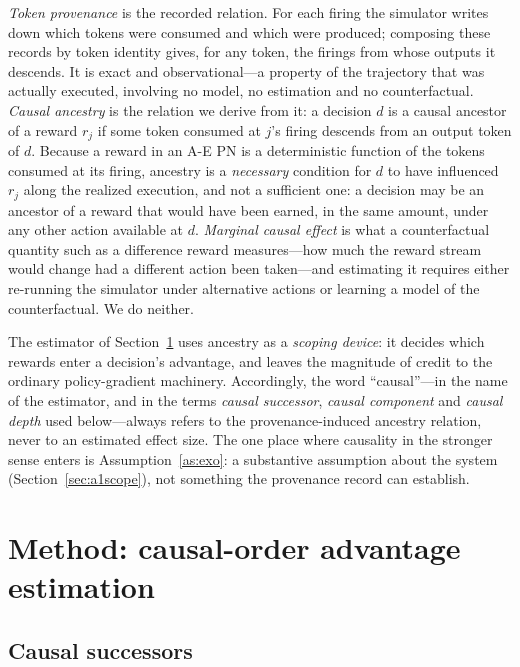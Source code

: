 \documentclass[review,authoryear,3p,times]{elsarticle}
\begin{document}
\emph{Token provenance} is the recorded relation. For each firing the simulator
writes down which tokens were consumed and which were produced; composing these
records by token identity gives, for any token, the firings from whose outputs
it descends. It is exact and observational---a property of the trajectory that
was actually executed, involving no model, no estimation and no counterfactual.
\emph{Causal ancestry} is the relation we derive from it: a decision $d$ is a
causal ancestor of a reward $r_j$ if some token consumed at $j$'s firing
descends from an output token of $d$. Because a reward in an A-E PN is a
deterministic function of the tokens consumed at its firing, ancestry is a
\emph{necessary} condition for $d$ to have influenced $r_j$ along the realized
execution, and not a sufficient one: a decision may be an ancestor of a reward
that would have been earned, in the same amount, under any other action
available at $d$. \emph{Marginal causal effect} is what a counterfactual
quantity such as a difference reward measures---how much the reward stream would
change had a different action been taken---and estimating it requires either
re-running the simulator under alternative actions or learning a model of the
counterfactual. We do neither.

The estimator of Section~\ref{sec:method} uses ancestry as a \emph{scoping
device}: it decides which rewards enter a decision's advantage, and leaves the
magnitude of credit to the ordinary policy-gradient machinery. Accordingly,
the word ``causal''---in the name of the estimator, and in the terms
\emph{causal successor}, \emph{causal component} and \emph{causal depth} used
below---always refers to the provenance-induced ancestry relation, never to an
estimated effect size. The one place where causality in the stronger sense enters is
Assumption~\ref{as:exo}: a substantive assumption about the system
(Section~\ref{sec:a1scope}), not something the provenance record can establish.

\section{Method: causal-order advantage estimation}
\label{sec:method}



\subsection{Causal successors}
\end{document}
